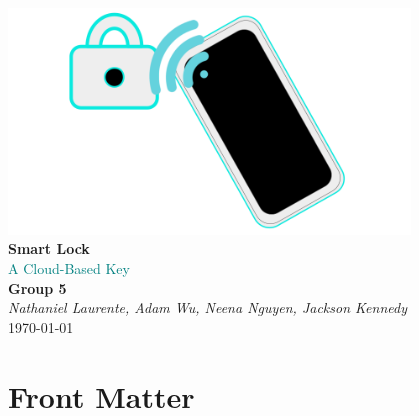 \documentclass[a4paper,12pt]{article}
\begin{document}
\begin{titlepage}
    \begin{center}
        \vspace*{2cm}

        \includegraphics[width=0.8\textwidth]{./img/slimg.png}\\[1cm]

        {\Huge \textbf{Smart Lock}}\\[0.5cm]
        {\textcolor{teal}{\Large A Cloud-Based Key}}\\[1.5cm]

        {\LARGE \textbf{Group 5}}\\[0.5cm]
        {\Large \textit{Nathaniel Laurente, Adam Wu, Neena Nguyen, Jackson Kennedy}}\\[2cm]

        {\Large \today}
    \end{center}
\end{titlepage}

\newpage
{}
\pagestyle{fancy}      





\section{Front Matter}






\tableofcontents
\newpage









\end{document}
